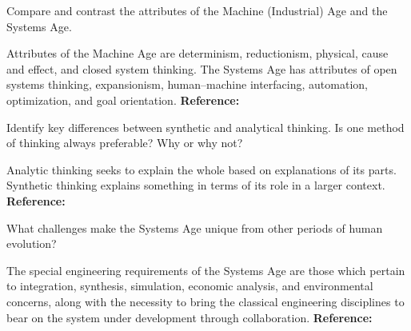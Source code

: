 \begin{exercises}
    \begin{exercise} 
    \label{sea-1-27}
        Compare and contrast the attributes of the Machine (Industrial) Age and the Systems Age.
    \end{exercise}
    \begin{solution}
        Attributes of the Machine Age are determinism, reductionism, physical, cause and effect, and closed system thinking. The Systems Age has attributes of open systems thinking, expansionism, human–machine interfacing, automation, optimization, and goal orientation. \textbf{Reference:}
    \end{solution}
    
    \begin{exercise} 
    \label{sea-1-28}
        Identify key differences between synthetic and analytical thinking. Is one method of thinking always preferable? Why or why not?
    \end{exercise}
    \begin{solution}
        Analytic thinking seeks to explain the whole based on explanations of its parts. Synthetic thinking explains something in terms of its role in a larger context. \textbf{Reference:}
    \end{solution}
    
    \begin{exercise} 
    \label{sea-1-29}
        What challenges make the Systems Age unique from other periods of human evolution?
    \end{exercise}
    \begin{solution}
        The special engineering requirements of the Systems Age are those which pertain to integration, synthesis, simulation, economic analysis, and environmental concerns, along with the necessity to bring the classical engineering disciplines to bear on the system under development through collaboration. \textbf{Reference:}
    \end{solution}
    

\end{exercises}

